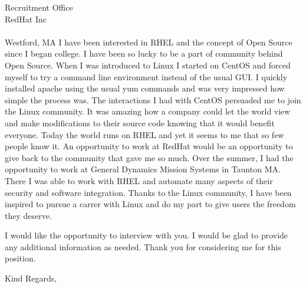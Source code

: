 \documentclass[11pt]{letter} %
\begin{document}
\begin{letter}{Recruitment Office\\
RedHat Inc\\ \\
Westford, MA}
I have been interested in RHEL and the concept of Open Source since I began college. I have been so lucky to be a part of community behind Open Source. When I was introduced to Linux I started on CentOS and forced myself to try a command line environment instead of the usual GUI. I quickly installed apache using the usual yum commands and was very impressed how simple the process was. The interactions I had with CentOS persuaded me to join the Linux community. It was amazing how a company could let the world view and make modifications to their source code knowing that it would benefit everyone. Today the world runs on RHEL and yet it seems to me that so few people know it. An opportunity to work at RedHat would be an opportunity to give back to the community that gave me so much. Over the summer, I had the opportunity to work at General Dynamics Mission Systems in Taunton MA. There I was able to work with RHEL and automate many aspects of their security and software integration. Thanks to the Linux community, I have been inspired to pursue a carrer with Linux and do my part to give users the freedom they deserve.
 
I would like the opportunity to interview with you. I would be glad to provide any additional information as needed. Thank you for considering me for this position.

\closing{Kind Regards,}




\end{letter}
\end{document}
